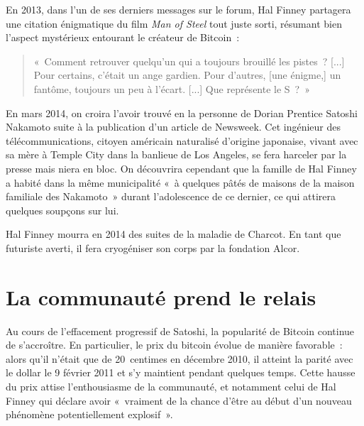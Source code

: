 En 2013, dans l'un de ses derniers messages sur le forum, Hal Finney partagera une citation énigmatique du film \emph{Man of Steel} tout juste sorti, résumant bien l'aspect mystérieux entourant le créateur de Bitcoin~:

\begin{quote}
«~Comment retrouver quelqu'un qui a toujours brouillé les pistes~? [...] Pour certains, c'était un ange gardien. Pour d'autres, [une énigme,] un fantôme, toujours un peu à l'écart. [...] Que représente le S~?~» %
\end{quote} 

En mars 2014, on croira l'avoir trouvé en la personne de Dorian Prentice Satoshi Nakamoto suite à la publication d'un article de Newsweek. Cet ingénieur des télécommunications, citoyen américain naturalisé d'origine japonaise, vivant avec sa mère à Temple City dans la banlieue de Los Angeles, se fera harceler par la presse mais niera en bloc. On découvrira cependant que la famille de Hal Finney a habité dans la même municipalité «~à quelques pâtés de maisons de la maison familiale des Nakamoto~» durant l'adolescence de ce dernier, ce qui attirera quelques soupçons sur lui. 

Hal Finney mourra en 2014 des suites de la maladie de Charcot. En tant que futuriste averti, il fera cryogéniser son corps par la fondation Alcor.

\section{La communauté prend le relais}

Au cours de l'effacement progressif de Satoshi, la popularité de Bitcoin continue de s'accroître. En particulier, le prix du bitcoin évolue de manière favorable~: alors qu'il n'était que de 20~centimes en décembre 2010, il atteint la parité avec le dollar le 9 février 2011 et s'y maintient pendant quelques temps. Cette hausse du prix attise l'enthousiasme de la communauté, et notamment celui de Hal Finney qui déclare avoir «~vraiment de la chance d'être au début d'un nouveau phénomène potentiellement explosif~».

